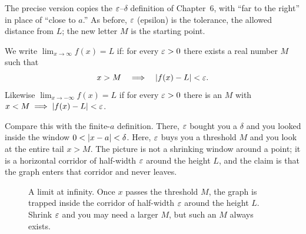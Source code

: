 The precise version copies the $\varepsilon$--$\delta$ definition of Chapter~6, with
``far to the right'' in place of ``close to $a$.'' As before, $\varepsilon$ (epsilon)
is the tolerance, the allowed distance from $L$; the new letter $M$ is the
starting point.

\begin{definition}
\label{ch09:def-limit-inf}
We write $\displaystyle\lim_{x\to\infty} f(x) = L$ if: for every $\varepsilon > 0$
there exists a real number $M$ such that
\[
   x > M \quad\Longrightarrow\quad \lvert f(x) - L\rvert < \varepsilon .
\]
Likewise $\displaystyle\lim_{x\to-\infty} f(x) = L$ if for every $\varepsilon>0$ there
is an $M$ with $x < M \implies \lvert f(x)-L\rvert<\varepsilon$.
\end{definition}

Compare this with the finite-$a$ definition. There, $\varepsilon$ bought you a $\delta$
and you looked inside the window $0<\lvert x-a\rvert<\delta$. Here, $\varepsilon$ buys you a
threshold $M$ and you look at the entire tail $x>M$. The picture is not a
shrinking window around a point; it is a horizontal corridor of half-width
$\varepsilon$ around the height $L$, and the claim is that the graph enters that
corridor and never leaves.

\begin{figure}[htbp]
\centering
{}
\caption{A limit at infinity. Once $x$ passes the threshold $M$, the graph is
trapped inside the corridor of half-width $\varepsilon$ around the height $L$. Shrink
$\varepsilon$ and you may need a larger $M$, but such an $M$ always exists.}
\label{ch09:fig-corridor}
\end{figure}

